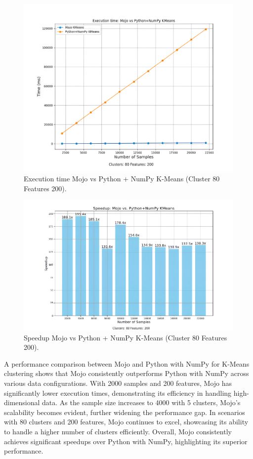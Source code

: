 \documentclass[conference]{IEEEtran}
\begin{document}
\begin{figure}[h]
    \centerline{\includegraphics[width=\linewidth]{fig5.png}}
    \caption{Execution time   Mojo vs Python + NumPy K-Means (Cluster 80 Features 200).}
    \label{fig5}
\end{figure}

\begin{figure}[h]
    \centerline{\includegraphics[width=\linewidth]{fig6.png}}
    \caption{Speedup   Mojo vs Python + NumPy K-Means (Cluster 80 Features 200).}
    \label{fig6}
\end{figure}

A performance comparison between Mojo and Python with NumPy for K-Means clustering shows that Mojo consistently outperforms Python with NumPy across various data configurations. With 2000 samples and 200 features, Mojo has significantly lower execution times, demonstrating its efficiency in handling high-dimensional data. As the sample size increases to 4000 with 5 clusters, Mojo's scalability becomes evident, further widening the performance gap. In scenarios with 80 clusters and 200 features, Mojo continues to excel, showcasing its ability to handle a higher number of clusters efficiently. Overall, Mojo consistently achieves significant speedups over Python with NumPy, highlighting its superior performance.
\end{document}
